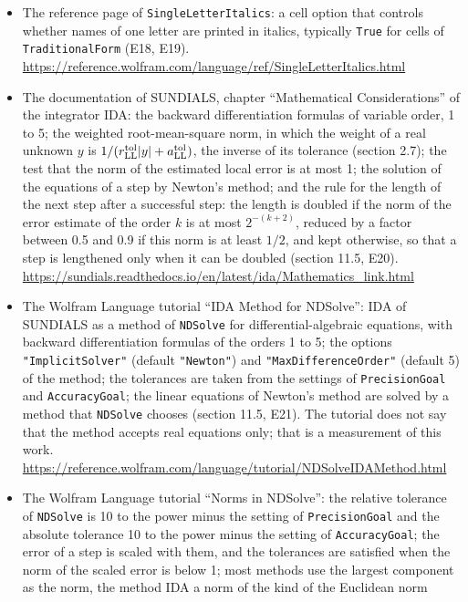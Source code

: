 \documentclass[
  10pt,
]{article}
\begin{document}
\begin{itemize}
\item
  The reference page of \texttt{SingleLetterItalics}: a cell option that
  controls whether names of one letter are printed in italics, typically
  \texttt{True} for cells of \texttt{TraditionalForm} (E18, E19).
  \url{https://reference.wolfram.com/language/ref/SingleLetterItalics.html}
\item
  The documentation of SUNDIALS, chapter ``Mathematical Considerations''
  of the integrator IDA: the backward differentiation formulas of
  variable order, 1 to 5; the weighted root-mean-square norm, in which
  the weight of a real unknown \(y\) is
  \(1/(r^{\rm tol}_{\rm LL}\lvert y\rvert+a^{\rm tol}_{\rm LL})\), the
  inverse of its tolerance (section 2.7); the test that the norm of the
  estimated local error is at most 1; the solution of the equations of a
  step by Newton's method; and the rule for the length of the next step
  after a successful step: the length is doubled if the norm of the
  error estimate of the order \(k\) is at most \(2^{-(k+2)}\), reduced
  by a factor between 0.5 and 0.9 if this norm is at least \(1/2\), and
  kept otherwise, so that a step is lengthened only when it can be
  doubled (section 11.5, E20).
  \url{https://sundials.readthedocs.io/en/latest/ida/Mathematics_link.html}
\item
  The Wolfram Language tutorial ``IDA Method for NDSolve'': IDA of
  SUNDIALS as a method of \texttt{NDSolve} for differential-algebraic
  equations, with backward differentiation formulas of the orders 1 to
  5; the options \texttt{"ImplicitSolver"} (default \texttt{"Newton"})
  and \texttt{"MaxDifferenceOrder"} (default 5) of the method; the
  tolerances are taken from the settings of \texttt{PrecisionGoal} and
  \texttt{AccuracyGoal}; the linear equations of Newton's method are
  solved by a method that \texttt{NDSolve} chooses (section 11.5, E21).
  The tutorial does not say that the method accepts real equations only;
  that is a measurement of this work.
  \url{https://reference.wolfram.com/language/tutorial/NDSolveIDAMethod.html}
\item
  The Wolfram Language tutorial ``Norms in NDSolve'': the relative
  tolerance of \texttt{NDSolve} is 10 to the power minus the setting of
  \texttt{PrecisionGoal} and the absolute tolerance 10 to the power
  minus the setting of \texttt{AccuracyGoal}; the error of a step is
  scaled with them, and the tolerances are satisfied when the norm of
  the scaled error is below 1; most methods use the largest component as
  the norm, the method IDA a norm of the kind of the Euclidean norm

\end{itemize}
\end{document}
